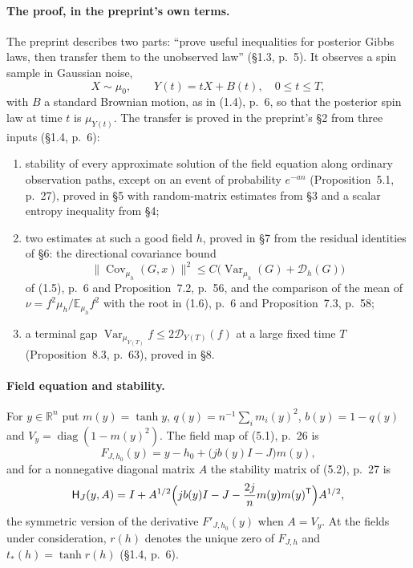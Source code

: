 \documentclass[11pt]{article}
\newcommand{\R}{\mathbb{R}}
\newcommand{\E}{\mathbb{E}}
\newcommand{\D}{\mathcal{D}}
\DeclareMathOperator{\Var}{Var}
\DeclareMathOperator{\Cov}{Cov}
\newcommand{\norm}[1]{\lVert #1\rVert}
\newcommand{\ploc}[2]{#1}
\begin{document}
\paragraph{The proof, in the preprint's own terms.}
The preprint describes two parts: ``prove useful inequalities for posterior
Gibbs laws, then transfer them to the unobserved law''
\ploc{(\S1.3, p.~5)}{introduction.tex:173--174}. It observes a spin sample in
Gaussian noise,
\[
 X\sim\mu_0,\qquad Y(t)=tX+B(t),\quad 0\le t\le T,
\]
with $B$ a standard Brownian motion, as in \ploc{(1.4), p.~6}{introduction.tex:199--201},
so that the posterior spin law at time $t$ is $\mu_{Y(t)}$. The transfer is
proved in the preprint's \S2 from three inputs
\ploc{(\S1.4, p.~6)}{introduction.tex:197--237}:
\begin{enumerate}
\item stability of every approximate solution of the field equation along
ordinary observation paths, except on an event of probability
$e^{-an}$ \ploc{(Proposition~5.1, p.~27)}{stability.tex:35--60}, proved in
\S5 with random-matrix estimates from \S3 and a scalar entropy inequality
from \S4;
\item two estimates at such a good field $h$, proved in \S7 from the residual
identities of \S6: the directional covariance bound
\[
 \norm{\Cov_{\mu_h}(G,x)}^2\le C\bigl(\Var_{\mu_h}(G)+\D_h(G)\bigr)
\]
of \ploc{(1.5), p.~6}{introduction.tex:214--217} and
\ploc{Proposition~7.2, p.~56}{consequences.tex:89--98}, and the comparison of
the mean of $\nu=f^2\mu_h/\E_{\mu_h}f^2$ with the root in
\ploc{(1.6), p.~6}{introduction.tex:218--224} and
\ploc{Proposition~7.3, p.~58}{consequences.tex:202--213};
\item a terminal gap $\Var_{\mu_{Y(T)}}f\le2\D_{Y(T)}(f)$ at a large fixed
time $T$ \ploc{(Proposition~8.3, p.~63)}{terminal.tex:334--433}, proved in \S8.
\end{enumerate}

\paragraph{Field equation and stability.}
For $y\in\R^n$ put $m(y)=\tanh y$, $q(y)=n^{-1}\sum_i m_i(y)^2$,
$b(y)=1-q(y)$ and $V_y=\operatorname{diag}(1-m(y)^2)$. The field map of
\ploc{(5.1), p.~26}{stability.tex:9--20} is
\[
 F_{J,h_0}(y)=y-h_0+\bigl(jb(y)I-J\bigr)m(y),
\]
and for a nonnegative diagonal matrix $A$ the stability matrix of
\ploc{(5.2), p.~27}{stability.tex:22--28} is
\[
 \mathsf H_J(y,A)=I+A^{1/2}\Bigl(jb(y)I-J-\frac{2j}{n}m(y)m(y)^{\mathsf T}\Bigr)A^{1/2},
\]
the symmetric version of the derivative $F'_{J,h_0}(y)$ when $A=V_y$.
At the fields under consideration, $r(h)$ denotes the unique zero of
$F_{J,h}$ and $t_*(h)=\tanh r(h)$
\ploc{(\S1.4, p.~6)}{introduction.tex:225--231}.
\end{document}
